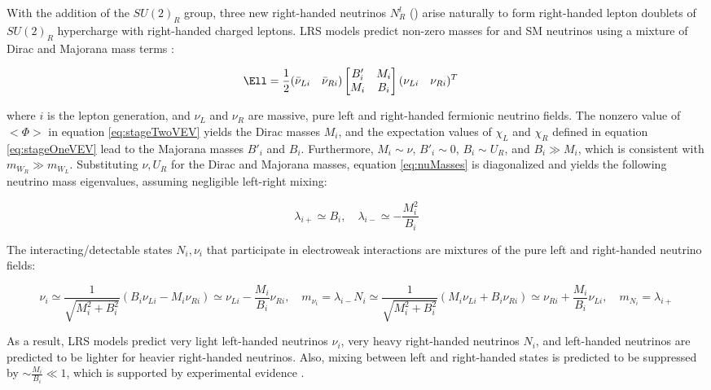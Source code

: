 With the addition of the $SU(2)_{R}$ group, three new right-handed neutrinos $N^{l}_{R}$ (\nul) arise naturally 
to form right-handed lepton doublets of $SU(2)_{R}$ hypercharge with right-handed charged leptons.  LRS models 
predict non-zero masses for \nul and SM neutrinos using a mixture of Dirac and Majorana mass terms \cite{seeSawAndParityViolation,seeSawAndGUTs}:

\begin{align}
	\Ell &= \frac{1}{2}(\bar{\nu}_{Li} \quad \bar{\nu}_{Ri})\begin{bmatrix}
	B'_{i} & M_{i} \\
	M_{i} & B_{i}
\end{bmatrix}(\nu_{Li} \quad \nu_{Ri})^{T}
\label{eq:nuMasses}
\end{align}

where $i$ is the lepton generation, and $\nu_{L}$ and $\nu_{R}$ are massive, pure left and right-handed 
fermionic neutrino fields.  The nonzero value of $<\Phi>$ in equation \ref{eq:stageTwoVEV} yields the 
Dirac masses $M_{i}$, and the expectation values of $\chi_{L}$ and $\chi_{R}$ defined in equation \ref{eq:stageOneVEV} 
lead to the Majorana masses $B'_{i}$ and $B_{i}$.  Furthermore, $M_{i} \sim \nu$, $B'_{i} \sim 0$, 
$B_{i} \sim U_{R}$, and $B_{i} \gg M_{i}$, which is consistent with $m_{W_{R}} \gg m_{W_{L}}$.  Substituting 
$\nu,U_{R}$ for the Dirac and Majorana masses, equation \ref{eq:nuMasses} is diagonalized and yields 
the following neutrino mass eigenvalues, assuming negligible left-right mixing:

\begin{equation}
	\lambda_{i+} \simeq B_{i},  \quad \lambda_{i-} \simeq -\frac{M^{2}_{i}}{B_{i}}
\end{equation}

The interacting/detectable states $N_{i}, \nu_{i}$ that participate in electroweak interactions are 
mixtures of the pure left and right-handed neutrino fields:

\begin{equation}
	\nu_{i} \simeq \frac{1}{\sqrt{M^{2}_{i} + B^{2}_{i}}}(B_{i}\nu_{Li} - M_{i}\nu_{Ri}) \simeq \nu_{Li} - \frac{M_{i}}{B_{i}}\nu_{Ri} , \quad m_{\nu_{i}} = \lambda_{i-}
	
	N_{i} \simeq \frac{1}{\sqrt{M^{2}_{i} + B^{2}_{i}}}(M_{i}\nu_{Li} + B_{i}\nu_{Ri}) \simeq \nu_{Ri} + \frac{M_{i}}{B_{i}}\nu_{Li} , \quad m_{N_{i}} = \lambda_{i+}
\end{equation}

As a result, LRS models predict very light left-handed neutrinos $\nu_{i}$, very heavy right-handed neutrinos 
$N_{i}$, and left-handed neutrinos are predicted to be lighter for heavier right-handed neutrinos.  Also, mixing 
between left and right-handed states is predicted to be suppressed by $\sim \frac{M_{i}}{B_{i}} \ll 1$, which 
is supported by experimental evidence \cite{dZeroMixingLimits,theoreticalMixingLimits}.

